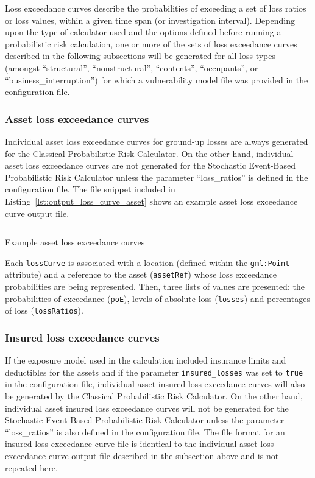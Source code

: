 Loss exceedance curves describe the probabilities of exceeding a set of loss
ratios or loss values, within a given time span (or investigation interval).
Depending upon the type of calculator used and the options defined before
running a probabilistic risk calculation, one or more of the sets of loss
exceedance curves described in the following subsections will be generated for
all loss types (amongst ``structural'', ``nonstructural'', ``contents'',
``occupants'', or ``business\_interruption'') for which a vulnerability model
file was provided in the configuration file.

\subsubsection{Asset loss exceedance curves}
\label{subsubsec:asset_loss_curves}

Individual asset loss exceedance curves for ground-up losses are always
generated for the Classical Probabilistic Risk Calculator. On the other hand,
individual asset loss exceedance curves are not generated for the Stochastic
Event-Based Probabilistic Risk Calculator unless the parameter
``loss\_ratios'' is defined in the configuration file. The file snippet
included in Listing~\ref{lst:output_loss_curve_asset} shows an example asset
loss exceedance curve output file.

\begin{listing}[htbp]
  \inputminted[firstline=1,firstnumber=1,fontsize=\footnotesize,frame=single,bgcolor=lightgray]{xml}{oqum/risk/verbatim/output_loss_curve_asset.xml}
  \caption{Example asset loss exceedance curves}
  \label{lst:output_loss_curve_asset}
\end{listing}

Each \Verb+lossCurve+ is associated with a location (defined within the
\Verb+gml:Point+ attribute) and a reference to the \gls{asset}
(\Verb+assetRef+) whose loss exceedance probabilities are being represented.
Then, three lists of values are presented: the probabilities of exceedance
(\Verb+poE+), levels of absolute loss (\Verb+losses+) and percentages of loss
(\Verb+lossRatios+).

\subsubsection{Insured loss exceedance curves}
\label{subsubsec:insured_loss_curves}

If the exposure model used in the calculation included insurance limits and
deductibles for the assets and if the parameter \Verb+insured_losses+ was set
to \Verb+true+ in the configuration file, individual asset insured loss
exceedance curves will also be generated by the Classical Probabilistic Risk
Calculator. On the other hand, individual asset insured loss exceedance curves
will not be generated for the Stochastic Event-Based Probabilistic Risk
Calculator unless the parameter ``loss\_ratios'' is also defined in the
configuration file. The file format for an insured loss exceedance curve file
is identical to the individual asset loss exceedance curve output file
described in the subsection above and is not repeated here.

